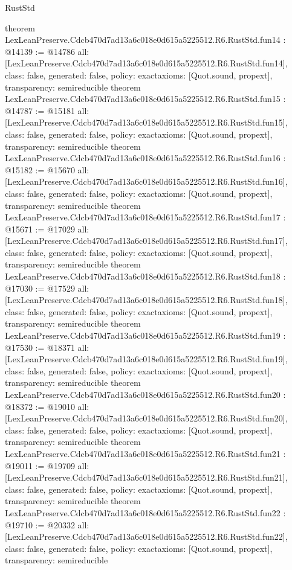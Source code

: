 \begin{lexlean}{RustStd}
\begin{coremodule}
{}
theorem LexLeanPreserve.Cdcb470d7ad13a6c018e0d615a5225512.R6.RustStd.fun14 : @14139 := @14786 {
  all: [LexLeanPreserve.Cdcb470d7ad13a6c018e0d615a5225512.R6.RustStd.fun14],
  class: false,
  generated: false,
  policy: exact{axioms: [Quot.sound, propext]},
  transparency: semireducible
}
theorem LexLeanPreserve.Cdcb470d7ad13a6c018e0d615a5225512.R6.RustStd.fun15 : @14787 := @15181 {
  all: [LexLeanPreserve.Cdcb470d7ad13a6c018e0d615a5225512.R6.RustStd.fun15],
  class: false,
  generated: false,
  policy: exact{axioms: [Quot.sound, propext]},
  transparency: semireducible
}
theorem LexLeanPreserve.Cdcb470d7ad13a6c018e0d615a5225512.R6.RustStd.fun16 : @15182 := @15670 {
  all: [LexLeanPreserve.Cdcb470d7ad13a6c018e0d615a5225512.R6.RustStd.fun16],
  class: false,
  generated: false,
  policy: exact{axioms: [Quot.sound, propext]},
  transparency: semireducible
}
theorem LexLeanPreserve.Cdcb470d7ad13a6c018e0d615a5225512.R6.RustStd.fun17 : @15671 := @17029 {
  all: [LexLeanPreserve.Cdcb470d7ad13a6c018e0d615a5225512.R6.RustStd.fun17],
  class: false,
  generated: false,
  policy: exact{axioms: [Quot.sound, propext]},
  transparency: semireducible
}
theorem LexLeanPreserve.Cdcb470d7ad13a6c018e0d615a5225512.R6.RustStd.fun18 : @17030 := @17529 {
  all: [LexLeanPreserve.Cdcb470d7ad13a6c018e0d615a5225512.R6.RustStd.fun18],
  class: false,
  generated: false,
  policy: exact{axioms: [Quot.sound, propext]},
  transparency: semireducible
}
theorem LexLeanPreserve.Cdcb470d7ad13a6c018e0d615a5225512.R6.RustStd.fun19 : @17530 := @18371 {
  all: [LexLeanPreserve.Cdcb470d7ad13a6c018e0d615a5225512.R6.RustStd.fun19],
  class: false,
  generated: false,
  policy: exact{axioms: [Quot.sound, propext]},
  transparency: semireducible
}
theorem LexLeanPreserve.Cdcb470d7ad13a6c018e0d615a5225512.R6.RustStd.fun20 : @18372 := @19010 {
  all: [LexLeanPreserve.Cdcb470d7ad13a6c018e0d615a5225512.R6.RustStd.fun20],
  class: false,
  generated: false,
  policy: exact{axioms: [Quot.sound, propext]},
  transparency: semireducible
}
theorem LexLeanPreserve.Cdcb470d7ad13a6c018e0d615a5225512.R6.RustStd.fun21 : @19011 := @19709 {
  all: [LexLeanPreserve.Cdcb470d7ad13a6c018e0d615a5225512.R6.RustStd.fun21],
  class: false,
  generated: false,
  policy: exact{axioms: [Quot.sound, propext]},
  transparency: semireducible
}
theorem LexLeanPreserve.Cdcb470d7ad13a6c018e0d615a5225512.R6.RustStd.fun22 : @19710 := @20332 {
  all: [LexLeanPreserve.Cdcb470d7ad13a6c018e0d615a5225512.R6.RustStd.fun22],
  class: false,
  generated: false,
  policy: exact{axioms: [Quot.sound, propext]},
  transparency: semireducible
}
\end{coremodule}
\end{lexlean}
